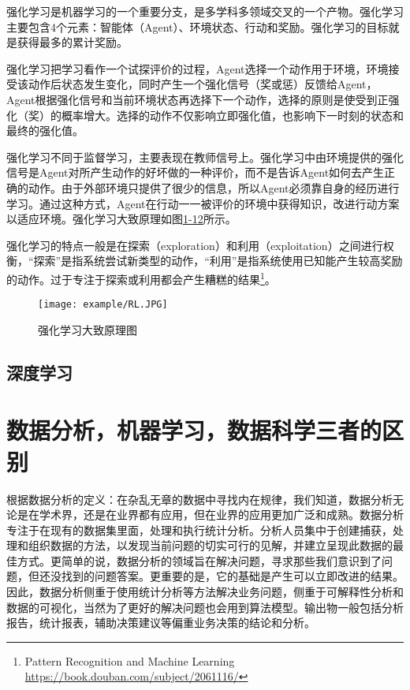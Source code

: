 强化学习是机器学习的一个重要分支，是多学科多领域交叉的一个产物。强化学习主要包含4个元素：智能体（Agent）、环境状态、行动和奖励。强化学习的目标就是获得最多的累计奖励。

强化学习把学习看作一个试探评价的过程，Agent选择一个动作用于环境，环境接受该动作后状态发生变化，同时产生一个强化信号（奖或惩）反馈给Agent，Agent根据强化信号和当前环境状态再选择下一个动作，选择的原则是使受到正强化（奖）的概率增大。选择的动作不仅影响立即强化值，也影响下一时刻的状态和最终的强化值。

强化学习不同于监督学习，主要表现在教师信号上。强化学习中由环境提供的强化信号是Agent对所产生动作的好坏做的一种评价，而不是告诉Agent如何去产生正确的动作。由于外部环境只提供了很少的信息，所以Agent必须靠自身的经历进行学习。通过这种方式，Agent在行动一一被评价的环境中获得知识，改进行动方案以适应环境。强化学习大致原理如图\href{figure:1-12}{1-12}所示。

强化学习的特点一般是在探索（exploration）和利用（exploitation）之间进行权衡，“探索”是指系统尝试新类型的动作，“利用”是指系统使用已知能产生较高奖励的动作。过于专注于探索或利用都会产生糟糕的结果\footnote{Pattern Recognition and Machine Learning \quad \url{https://book.douban.com/subject/2061116/}}。

\begin{figure}[!htp]
\centering
\texttt{[image: example/RL.JPG]}
\caption{强化学习大致原理图}
\label{figure:1-12}
\end{figure}

\subsection{深度学习}


\section{数据分析，机器学习，数据科学三者的区别}

根据数据分析的定义：在杂乱无章的数据中寻找内在规律，我们知道，数据分析无论是在学术界，还是在业界都有应用，但在业界的应用更加广泛和成熟。数据分析专注于在现有的数据集里面，处理和执行统计分析。分析人员集中于创建捕获，处理和组织数据的方法，以发现当前问题的切实可行的见解，并建立呈现此数据的最佳方式。更简单的说，数据分析的领域旨在解决问题，寻求那些我们意识到了问题，但还没找到的问题答案。更重要的是，它的基础是产生可以立即改进的结果。因此，数据分析侧重于使用统计分析等方法解决业务问题，侧重于可解释性分析和数据的可视化，当然为了更好的解决问题也会用到算法模型。输出物一般包括分析报告，统计报表，辅助决策建议等偏重业务决策的结论和分析。

